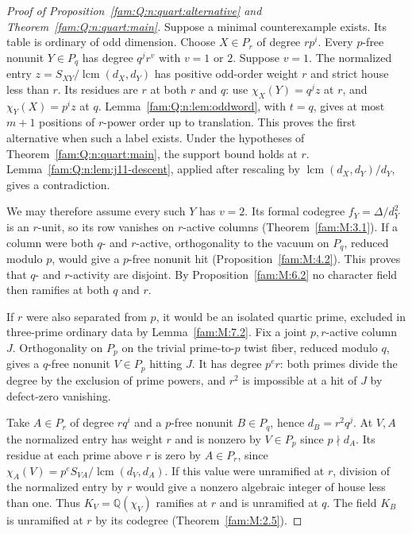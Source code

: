 \documentclass[11pt,a4paper]{article}
\numberwithin{equation}{section}
\theoremstyle{remark}
\newcommand{\QQ}{\mathbb Q}
\newcommand{\lcm}{\operatorname{lcm}}
\begin{document}
\begin{proof}[Proof of Proposition~\ref{fam:Q:n:quart:alternative} and Theorem~\ref{fam:Q:n:quart:main}]
Suppose a minimal counterexample exists. Its table is ordinary
of odd dimension. Choose $X\in P_r$ of degree $rp^i$.
Every $p$-free nonunit $Y\in P_q$ has degree $q^j r^v$ with
$v=1$ or $2$. Suppose $v=1$. The normalized entry
$z=S_{XY}/\lcm(d_X,d_Y)$ has positive odd-order weight $r$ and
strict house less than $r$. Its residues are $r$ at both $r$ and
$q$: use $\chi_X(Y)=q^jz$ at $r$, and $\chi_Y(X)=p^iz$ at $q$.
Lemma~\ref{fam:Q:n:lem:oddword}, with $t=q$, gives at most $m+1$ positions
of $r$-power order up to translation. This proves the first alternative when such a label exists.
Under the hypotheses of Theorem~\ref{fam:Q:n:quart:main},
the support bound holds at $r$. Lemma~\ref{fam:Q:n:lem:j11-descent},
applied after rescaling by $\lcm(d_X,d_Y)/d_Y$, gives a contradiction.

We may therefore assume every such $Y$ has $v=2$. Its formal codegree
$f_Y=\Delta/d_Y^2$ is an $r$-unit, so its row vanishes on
$r$-active columns (Theorem~\ref{fam:M:3.1}). If a column were
both $q$- and $r$-active, orthogonality to the vacuum on $P_q$,
reduced modulo $p$, would give a $p$-free nonunit hit
(Proposition~\ref{fam:M:4.2}). This proves that $q$- and $r$-activity
are disjoint. By Proposition~\ref{fam:M:6.2} no character field
then ramifies at both $q$ and $r$.

If $r$ were also separated from $p$, it would be an isolated
quartic prime, excluded in three-prime ordinary data by
Lemma~\ref{fam:M:7.2}. Fix a joint $p,r$-active column $J$.
Orthogonality on $P_p$ on the trivial prime-to-$p$ twist fiber, reduced modulo $q$, gives a $q$-free nonunit
$V\in P_p$ hitting $J$. It has degree $p^e r$: both primes
divide the degree by the exclusion of prime powers, and $r^2$
is impossible at a hit of $J$ by defect-zero vanishing.

Take $A\in P_r$ of degree $rq^i$ and a $p$-free nonunit
$B\in P_q$, hence $d_B=r^2q^j$. At $V,A$ the normalized entry
has weight $r$ and is nonzero by $V\in P_p$ since $p\nmid d_A$.
Its residue at each prime above $r$ is zero by $A\in P_r$,
since $\chi_A(V)=p^e S_{VA}/\lcm(d_V,d_A)$. If this value
were unramified at $r$, division of the normalized entry by $r$
would give a nonzero algebraic integer of house less than one.
Thus $K_V=\QQ(\chi_V)$ ramifies at $r$ and is unramified at $q$.
The field $K_B$ is unramified at $r$ by its codegree
(Theorem~\ref{fam:M:2.5}).


\end{proof}
\end{document}
